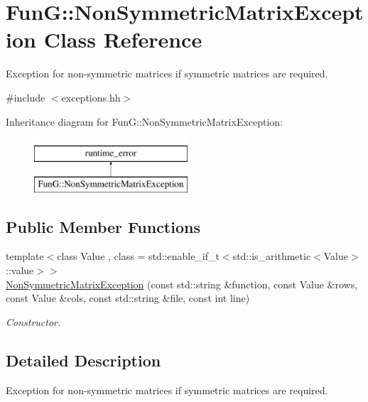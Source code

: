 \hypertarget{classFunG_1_1NonSymmetricMatrixException}{}\section{FunG\+:\+:Non\+Symmetric\+Matrix\+Exception Class Reference}
\label{classFunG_1_1NonSymmetricMatrixException}


Exception for non-\/symmetric matrices if symmetric matrices are required.  




{\ttfamily \#include $<$exceptions.\+hh$>$}

Inheritance diagram for FunG\+:\+:Non\+Symmetric\+Matrix\+Exception\+:\begin{figure}[H]
\begin{center}
\leavevmode
\includegraphics[height=2.000000cm]{classFunG_1_1NonSymmetricMatrixException}
\end{center}
\end{figure}
\subsection*{Public Member Functions}
\begin{DoxyCompactItemize}
\item 
{\footnotesize template$<$class Value , class  = std\+::enable\+\_\+if\+\_\+t$<$std\+::is\+\_\+arithmetic$<$\+Value$>$\+::value$>$$>$ }\\\hyperlink{classFunG_1_1NonSymmetricMatrixException_a1c11fd643c37e5fa2145aba2cc7ab09d}{Non\+Symmetric\+Matrix\+Exception} (const std\+::string \&function, const Value \&rows, const Value \&cols, const std\+::string \&file, const int line)
\begin{DoxyCompactList}\small\item\em Constructor. \end{DoxyCompactList}\end{DoxyCompactItemize}


\subsection{Detailed Description}
Exception for non-\/symmetric matrices if symmetric matrices are required. 


